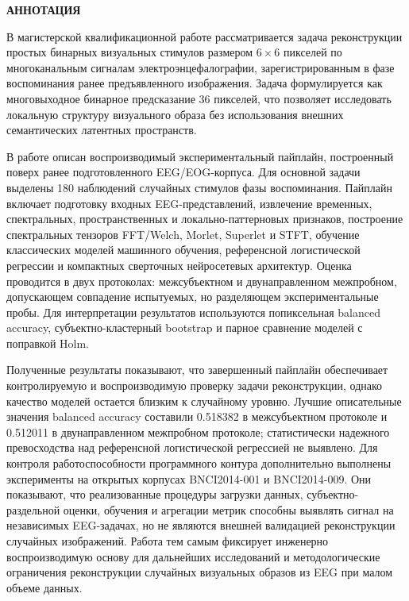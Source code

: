 \newpage
\begin{center}
  \textbf{\large АННОТАЦИЯ}
\end{center}

В магистерской квалификационной работе рассматривается задача реконструкции
простых бинарных визуальных стимулов размером $6 \times 6$ пикселей по
многоканальным сигналам электроэнцефалографии, зарегистрированным в фазе
воспоминания ранее предъявленного изображения. Задача формулируется как
многовыходное бинарное предсказание 36 пикселей, что позволяет исследовать
локальную структуру визуального образа без использования внешних семантических
латентных пространств.

В работе описан воспроизводимый экспериментальный пайплайн, построенный поверх
ранее подготовленного EEG/EOG-корпуса. Для основной задачи выделены 180
наблюдений случайных стимулов фазы воспоминания. Пайплайн включает подготовку
входных EEG-представлений, извлечение временных, спектральных,
пространственных и локально-паттерновых признаков, построение спектральных
тензоров FFT/Welch, Morlet, Superlet и STFT, обучение классических моделей
машинного обучения, референсной логистической регрессии и компактных
сверточных нейросетевых архитектур. Оценка проводится в двух протоколах:
межсубъектном и двунаправленном межпробном, допускающем совпадение испытуемых,
но разделяющем экспериментальные пробы. Для интерпретации результатов
используются попиксельная balanced accuracy, субъектно-кластерный bootstrap и
парное сравнение моделей с поправкой Holm.

Полученные результаты показывают, что завершенный пайплайн обеспечивает
контролируемую и воспроизводимую проверку задачи реконструкции, однако
качество моделей остается близким к случайному уровню. Лучшие описательные
значения balanced accuracy составили 0.518382 в межсубъектном протоколе и
0.512011 в двунаправленном межпробном протоколе; статистически надежного
превосходства над референсной логистической регрессией не выявлено. Для
контроля работоспособности программного контура дополнительно выполнены
эксперименты на открытых корпусах BNCI2014-001 и BNCI2014-009. Они показывают,
что реализованные процедуры загрузки данных, субъектно-раздельной оценки,
обучения и агрегации метрик способны выявлять сигнал на независимых EEG-задачах,
но не являются внешней валидацией реконструкции случайных изображений. Работа
тем самым фиксирует инженерно воспроизводимую основу для дальнейших
исследований и методологические ограничения реконструкции случайных визуальных
образов из EEG при малом объеме данных.

\onehalfspacing
